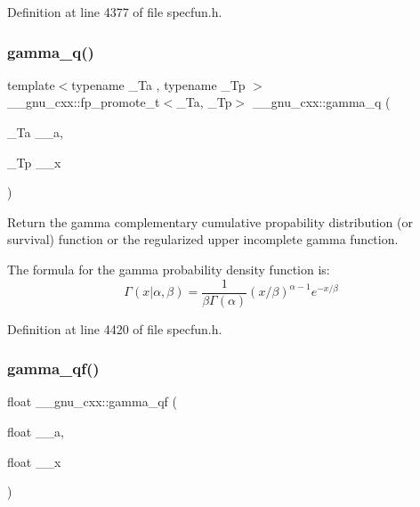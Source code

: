 Definition at line 4377 of file specfun.\+h.

\mbox{\label{group__gnu__math__spec__func_ga10c246b2fa2ce000dc5d7c81e9e98c58}} 
\subsubsection{\texorpdfstring{gamma\+\_\+q()}{gamma\_q()}}
{\footnotesize\ttfamily template$<$typename \+\_\+\+Ta , typename \+\_\+\+Tp $>$ \\
\+\_\+\+\_\+gnu\+\_\+cxx\+::fp\+\_\+promote\+\_\+t$<$\+\_\+\+Ta, \+\_\+\+Tp$>$ \+\_\+\+\_\+gnu\+\_\+cxx\+::gamma\+\_\+q (\begin{DoxyParamCaption}\item[{\+\_\+\+Ta}]{\+\_\+\+\_\+a,  }\item[{\+\_\+\+Tp}]{\+\_\+\+\_\+x }\end{DoxyParamCaption})\hspace{0.3cm}{\ttfamily [inline]}}



Return the gamma complementary cumulative propability distribution (or survival) function or the regularized upper incomplete gamma function. 

The formula for the gamma probability density function is\+: \[ \Gamma(x|\alpha,\beta) = \frac{1}{\beta\Gamma(\alpha)} (x/\beta)^{\alpha - 1} e^{-x/\beta} \] 

Definition at line 4420 of file specfun.\+h.

\mbox{\label{group__gnu__math__spec__func_ga3ee8d2c40b904952538709cbb0e664a4}} 
\subsubsection{\texorpdfstring{gamma\+\_\+qf()}{gamma\_qf()}}
{\footnotesize\ttfamily float \+\_\+\+\_\+gnu\+\_\+cxx\+::gamma\+\_\+qf (\begin{DoxyParamCaption}\item[{float}]{\+\_\+\+\_\+a,  }\item[{float}]{\+\_\+\+\_\+x }\end{DoxyParamCaption})\hspace{0.3cm}{\ttfamily [inline]}}



